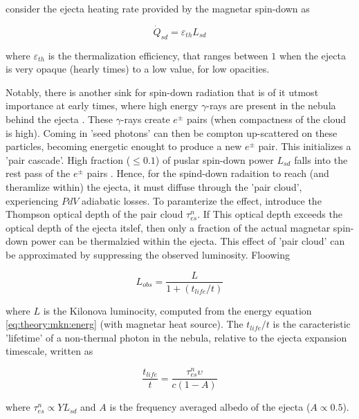 \documentclass[11pt,a4paper,headinclude=true,DIV=14,BCOR=8mm,chapterprefix,listof=totoc,twoside,openright,abstracton]{scrbook}
\begin{document}
consider the ejecta heating rate provided by the magnetar spin-down as 

\begin{equation}
    \dot{Q}_{sd} = \varepsilon_{th}L_{sd}
\end{equation}

where $\varepsilon_{th}$ is the thermalization efficiency, that ranges between $1$ when the ejecta is very opaque (hearly times) to a low value, for low opacities.

Notably, there is another sink for spin-down radiation that is of it utmost importance at early times, where high energy $\gamma$-rays are present in the nebula behind the ejecta \cite{Metzger and Piro (2014)}. These $\gamma$-rays create $e^{\pm}$ pairs (when compactness of the cloud is high). Coming in 'seed photons' can then be compton up-scattered on these particles, becoming energetic enought to produce a new $e^{\pm}$ pair. This initializes a 'pair cascade'. High fraction ($\leq 0.1$) of puslar spin-down power $L_{sd}$ falls into the rest pass of the $e^{\pm}$ pairs \cite{(Svensson 1987; Lightman et al 1987)}. Hence, for the spind-down radaition to reach (and theramlize within) the ejecta, it must diffuse through the 'pair cloud', experiencing $PdV$ adiabatic losses.
To paramterize the effect, introduce the Thompson optical depth of the pair cloud $\tau_{es}^n$. If This optical depth exceeds the optical depth of the ejecta itslef, then only a fraction of the actual magnetar spin-down power can be thermalzied within the ejecta. 
This effect of 'pair cloud' can be approximated by suppressing the observed luminosity. Floowing \cite{Metzger and Piro (2014) and Kasen et al (2015),} 

\begin{equation}
    L_{obs} = \frac{L}{1 + (t_{life}/t)}
\end{equation}

where $L$ is the Kilonova luminocity, computed from the energy equation \eqref{eq:theory:mkn:energ} (with magnetar heat source).
The $t_{life}/t$ is the caracteristic 'lifetime' of a non-thermal photon in the nebula, relative to the ejecta expansion timescale, written as

\begin{equation}
    \frac{t_{life}}{t} = \frac{\tau_{es}^{n} \upsilon}{c(1 - A)}
\end{equation}

where $\tau_{es}^n\propto Y L_{sd}$ and $A$ is the frequency averaged albedo of the ejecta ($A\propto 0.5$).
\end{document}
